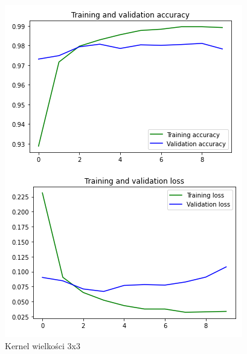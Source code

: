 \documentclass{article}
\begin{document}
\begin{figure}[h]
  \centering
  \includegraphics[width=\linewidth]{kernel_3_3.png}
  \caption{Kernel wielkości 3x3}
\end{figure}
\end{document}
